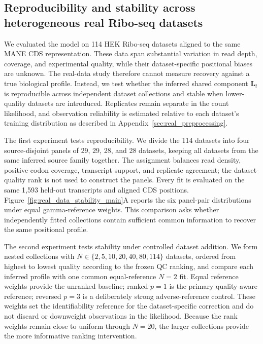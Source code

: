 \subsection{Reproducibility and stability across heterogeneous real Ribo-seq datasets}
\label{sec:real_data_stability_main}

We evaluated the model on 114 HEK Ribo-seq datasets aligned to the same MANE
CDS representation.  These data span substantial variation in read depth,
coverage, and experimental quality, while their dataset-specific positional
biases are unknown.  The real-data study therefore cannot measure recovery
against a true biological profile.  Instead, we test whether the inferred
shared component $\mathbf{L}_t$ is reproducible across independent dataset
collections and stable when lower-quality datasets are introduced.  Replicates
remain separate in the count likelihood, and observation reliability is
estimated relative to each dataset's training distribution as described in
Appendix~\ref{sec:real_preprocessing}.

The first experiment tests reproducibility.  We divide the 114 datasets into
four source-disjoint panels of 29, 29, 28, and 28 datasets, keeping all datasets
from the same inferred source family together.  The assignment balances read
density, positive-codon coverage, transcript support, and replicate agreement;
the dataset-quality rank is not used to construct the panels.  Every fit is
evaluated on the same 1,593 held-out transcripts and aligned CDS positions.
Figure~\ref{fig:real_data_stability_main}A reports the six panel-pair
distributions under equal gamma-reference weights.  This comparison asks
whether independently fitted collections contain sufficient common information
to recover the same positional profile.

The second experiment tests stability under controlled dataset addition.  We
form nested collections with $N\in\{2,5,10,20,40,80,114\}$ datasets, ordered
from highest to lowest quality according to the frozen QC ranking, and compare
each inferred profile with one common equal-reference $N=2$ fit.  Equal
reference weights provide the unranked baseline; ranked $p=1$ is the primary
quality-aware reference; reversed $p=3$ is a deliberately strong
adverse-reference control.  These weights set
the identifiability reference for the dataset-specific correction and do not
discard or downweight observations in the likelihood.  Because the rank weights
remain close to uniform through $N=20$, the larger collections provide the more
informative ranking intervention.

